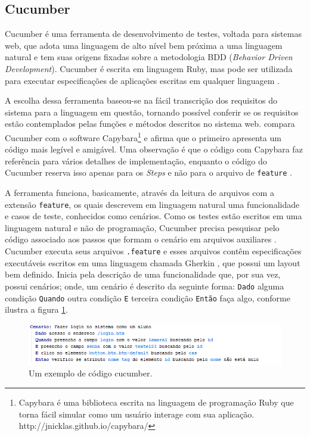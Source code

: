 \documentclass[tg]{mdtufsm}
\begin{document}
\subsection{Cucumber}
Cucumber é uma ferramenta de desenvolvimento de testes, voltada para sistemas web, que adota uma linguagem de alto nível bem próxima a uma linguagem natural e tem suas origens fixadas sobre a metodologia BDD (\emph{Behavior Driven Development}). Cucumber
é escrita em linguagem Ruby, mas pode ser utilizada para executar especificações de aplicações escritas em qualquer linguagem \cite{nunescucumber}.

A escolha dessa ferramenta baseou-se na fácil transcrição dos requisitos do sistema para a linguagem em questão, tornando possível conferir se os requisitos estão contemplados pelas funções e métodos descritos no sistema web.
\citeauthor{lopescucumbervalor}\cite{lopescucumbervalor} compara Cucumber com o software Capybara\footnote{Capybara é uma biblioteca escrita na linguagem de programação Ruby que torna fácil simular como um usuário interage com sua aplicação. http://jnicklas.github.io/capybara/} e afirma que o primeiro apresenta um código mais legível e amigável. Uma observação é que o código com Capybara faz
referência para vários detalhes de implementação, enquanto o código do Cucumber reserva isso apenas para os \emph{Steps} e não para o arquivo de \texttt{feature} \cite{lopescucumbervalor}.

A ferramenta funciona, basicamente, através da leitura de arquivos com a extensão \texttt{feature}, os quais descrevem em linguagem natural uma funcionalidade e casos de teste, conhecidos como cenários.
Como os testes estão escritos em uma linguagem natural e não de programação, Cucumber precisa pesquisar pelo código associado aos passos que formam o cenário em arquivos auxiliares \cite{scmitzcucumberreview}. Cucumber
executa seus arquivos \texttt{.feature} e esses arquivos contêm especificações executáveis escritos em uma linguagem chamada Gherkin \cite{cucumberwiki}, que possui um layout bem definido. Inicia pela descrição de uma funcionalidade
que, por sua vez, possui cenários; onde, um cenário é descrito da seguinte forma: \texttt{Dado} alguma condição \texttt{Quando} outra condição \texttt{E} terceira condição \texttt{Então} faça algo, conforme ilustra a figura \ref{fig:codigo_cucumber}.

\begin{figure}[!htb]
	\centering
	\includegraphics[width=1.1
	\textwidth]{codigo_cucumber}
	\caption{Um exemplo de código cucumber.}
	\label{fig:codigo_cucumber}
\end{figure}
\end{document}
